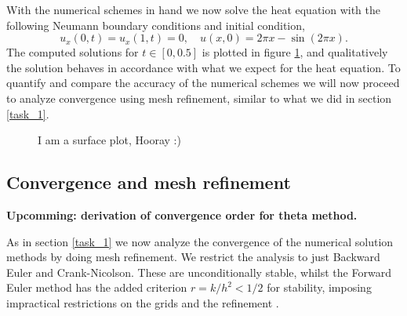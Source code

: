 With the numerical schemes in hand we now solve the heat equation with the following Neumann boundary conditions and initial condition, 
\begin{equation}
    u_x(0,t) = u_x(1,t) = 0, \quad u(x,0) = 2\pi x - \sin(2\pi x). 
    \label{eq:2a}
\end{equation}
The computed solutions for $t \in [0, 0.5]$ is plotted in figure \ref{fig:task2-surface}, 
and qualitatively the solution behaves in accordance with what we expect for the heat equation. 
To quantify and compare the accuracy of the numerical schemes we will now proceed to analyze convergence using mesh refinement, 
similar to what we did in section \ref{task_1}. 

\begin{figure}
    
    \caption{I am a surface plot, Hooray :)}
    \label{fig:task2-surface}
\end{figure}

%    

\subsection{Convergence and mesh refinement}
\textbf{Upcomming: derivation of convergence order for theta method.}

As in section \ref{task_1} we now analyze the convergence of the numerical solution methods 
by doing mesh refinement. 
We restrict the analysis to just Backward Euler and Crank-Nicolson. 
These are unconditionally stable, 
whilst the Forward Euler method has the added criterion $r=k/h^2 < 1/2$ for stability, 
imposing impractical restrictions on the grids and the refinement \cite{TODO}. 

